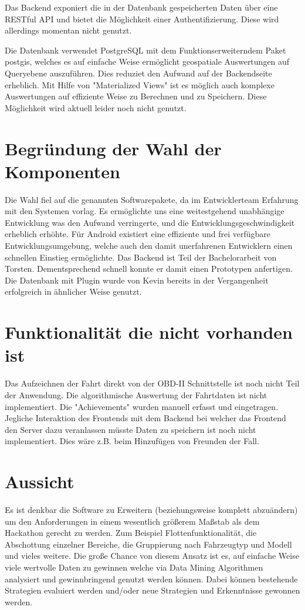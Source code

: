 \documentclass[12pt,a4paper,bibliography=totocnumbered,listof=totocnumbered]{scrartcl}
\begin{document}
Das Backend exponiert die in der Datenbank gespeicherten Daten über eine RESTful API und bietet die Möglichkeit einer Authentifizierung. Diese wird allerdings momentan nicht genutzt.

Die Datenbank verwendet PostgreSQL mit dem Funktionserweiterndem Paket postgis, welches es auf einfache Weise ermöglicht geospatiale Auswertungen auf Queryebene auszuführen. Dies reduziet den Aufwand auf der Backendseite erheblich. Mit Hilfe von "Materialized Views" ist es möglich auch komplexe Auswertungen auf effiziente Weise zu Berechnen und zu Speichern. Diese Möglichkeit wird aktuell leider noch nicht genutzt.

\section{Begründung der Wahl der Komponenten}
Die Wahl fiel auf die genannten Softwarepakete, da im Entwicklerteam Erfahrung mit den Systemen vorlag. Es ermöglichte uns eine weitestgehend unabhängige Entwicklung was den Aufwand verringerte, und die Entwicklungsgeschwindigkeit erheblich erhöhte. 
Für Android existiert eine effiziente und frei verfügbare Entwicklungsumgebung, welche auch den damit unerfahrenen Entwicklern einen schnellen Einstieg ermöglichte.
Das Backend ist Teil der Bachelorarbeit von Torsten. Dementsprechend schnell konnte er damit einen Prototypen anfertigen.
Die Datenbank mit Plugin wurde von Kevin bereits in der Vergangenheit erfolgreich in ähnlicher Weise genutzt.

\section{Funktionalität die nicht vorhanden ist}
Das Aufzeichnen der Fahrt direkt von der OBD-II Schnittstelle ist noch nicht Teil der Anwendung.
Die algorithmische Auswertung der Fahrtdaten ist nicht implementiert. Die "Achievements" wurden manuell erfasst und eingetragen.
Jegliche Interaktion des Frontends mit dem Backend bei welcher das Frontend den Server dazu veranlassen müsste Daten zu speichern ist noch nicht implementiert. Dies wäre z.B. beim Hinzufügen von Freunden der Fall.

\section{Aussicht}

Es ist denkbar die Software zu Erweitern (beziehungsweise komplett abzuändern) um den Anforderungen in einem wesentlich größerem Maßstab als dem Hackathon gerecht zu werden.
Zum Beispiel Flottenfunktionalität, die Abschottung einzelner Bereiche, die Gruppierung nach Fahrzeugtyp und Modell und vieles weitere.
Die große Chance von diesem Ansatz ist es, auf einfache Weise viele wertvolle Daten zu gewinnen welche via Data Mining Algorithmen analysiert und gewinnbringend genutzt werden können.
Dabei können bestehende Strategien evaluiert werden und/oder neue Strategien und Erkenntnisse gewonnen werden.
\end{document}
